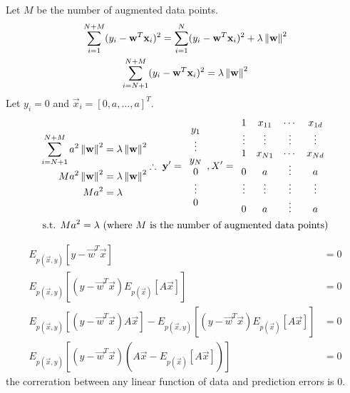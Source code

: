 \documentclass{introtosml}
\newcommand\Ep[1]{E_{p(\vec{x}, y)} \left[ #1 \right]}
\newcommand{\x}{\vec{x}}
\newcommand{\w}{\vec{w}}
\begin{document}
\begin{p}
  \item
    Let $M$ be the number of augmented data points.
    \begin{gather*}
      \sum_{i=1}^{N+M} (y_i - \w^T \x_i)^2
          = \sum_{i=1}^{N} (y_i - \w^T \x_i)^2 + \lambda \norm{\w}^2 \\
      \sum_{i=N+1}^{N+M} (y_i - \w^T \x_i)^2 = \lambda \norm{\w}^2
    \end{gather*}
    Let $y_i = 0$ and $\x_i = [0, a, \ldots, a]^T $.
    \begin{gather*}
      \begin{aligned}
        \sum_{i=N+1}^{N+M} a^2 \norm{\w}^2 & = \lambda \norm{\w}^2 \\
        M a^2 \norm{\w}^2 & = \lambda \norm{\w}^2 \\
        M a^2 & = \lambda
      \end{aligned}
      \therefore \vec{y}' = \begin{array}{cccc}
        y_1 \\ \vdots \\ y_N \\ 0 \\ \vdots \\ 0
      \end{array},
      X' = \begin{array}{cccc}
        1 & x_{11} & \cdots & x_{1d} \\
        \vdots & \vdots & \vdots & \vdots  \\
        1 & x_{N1} & \cdots & x_{Nd} \\
        0 & a & \vdots & a \\
        \vdots & \vdots & \vdots & \vdots  \\
        0 & a & \vdots & a \\
      \end{array} \\
      \st Ma^2 = \lambda \text{(where $M$ is the number of augmented data points)}
    \end{gather*}

  \item
    \begin{align*}
      \Ep{y - \vec{w}^T \vec{x}} & = 0 \\
      \Ep{(y - \vec{w}^T \vec{x}) E_{p(\vec{x})} \left[ A \vec{x} \right]} & = 0 \\
      \Ep{(y - \vec{w}^T \vec{x}) A \vec{x}}
          - \Ep{(y - \vec{w}^T \vec{x}) E_{p(\vec{x})} \left[ A \vec{x} \right]} & = 0 \\
      \Ep{(y - \vec{w}^T \vec{x}) (A \vec{x} - E_{p(\vec{x})} \left[ A \vec{x} \right])} & = 0
    \end{align*}
    \therefore the correration between any linear function of data and prediction errors is 0.


\end{p}
\end{document}
